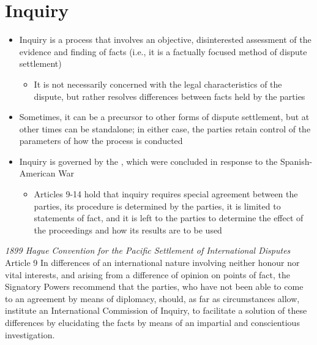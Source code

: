 \section{Inquiry}
\begin{itemize}
    \item Inquiry is a process that involves an objective, disinterested assessment of the evidence and finding of facts (i.e., it is a factually focused method of dispute settlement)
    \begin{itemize}
        \item It is not necessarily concerned with the legal characteristics of the dispute, but rather resolves differences between facts held by the parties
    \end{itemize}
    \item Sometimes, it can be a precursor to other forms of dispute settlement, but at other times can be standalone; in either case, the parties retain control of the parameters of how the process is conducted
    \item Inquiry is governed by the , which were concluded in response to the Spanish-American War
    \begin{itemize}
        \item Articles 9-14 hold that inquiry requires special agreement between the parties, its procedure is determined by the parties, it is limited to statements of fact, and it is left to the parties to determine the effect of the proceedings and how its results are to be used
    \end{itemize}
\end{itemize}

\begin{conventiondetails}{\textit{1899 Hague Convention for the Pacific Settlement of International Disputes} Article 9}
    \flushleft
    In differences of an international nature involving neither honour nor vital interests, and arising from a difference of opinion on points of fact, the Signatory Powers recommend that the parties, who have not been able to come to an agreement by means of diplomacy, should, as far as circumstances allow, institute an International Commission of Inquiry, to facilitate a solution of these differences by elucidating the facts by means of an impartial and conscientious investigation.
\end{conventiondetails}

